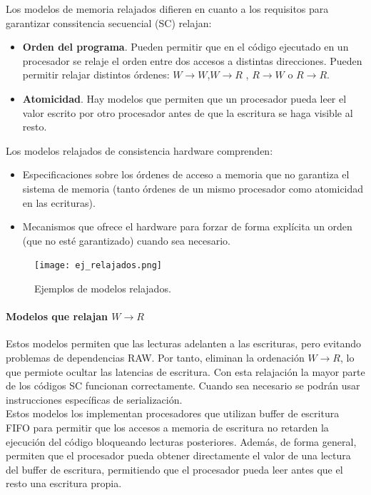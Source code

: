 \documentclass[12pt,spanish]{article}
\begin{document}
Los modelos de memoria relajados difieren en cuanto a los requisitos para garantizar conssitencia secuencial (SC) relajan:
\begin{itemize}
	\item \textbf{Orden del programa}. Pueden permitir que en el código ejecutado en un procesador se relaje el orden entre dos accesos a distintas direcciones. Pueden permitir relajar distintos órdenes: $W \rightarrow W$,$W \rightarrow R$ , $R \rightarrow W$ o $R \rightarrow R$.
	\item \textbf{Atomicidad}. Hay modelos que permiten que un procesador pueda leer el valor escrito por otro procesador antes de que la escritura se haga visible al resto.
\end{itemize}

Los modelos relajados de consistencia hardware comprenden:

\begin{itemize}
	\item Especificaciones sobre los órdenes de acceso a memoria que no garantiza el sistema de memoria (tanto órdenes de un mismo procesador como atomicidad en las ecrituras).
	\item Mecanismos que ofrece el hardware para forzar de forma explícita un orden (que no esté garantizado) cuando sea necesario.
\end{itemize}

\begin{figure}[H]
\centering
\texttt{[image: ej\_relajados.png]}
\caption{Ejemplos de modelos relajados.}
\end{figure}

\paragraph{Modelos que relajan $W \rightarrow R$\\}

Estos modelos permiten que las lecturas adelanten a las escrituras, pero evitando problemas de dependencias RAW. Por tanto, eliminan la ordenación $W \rightarrow R$, lo que permiote ocultar las latencias de escritura. Con esta relajación la mayor parte de los códigos SC funcionan correctamente. Cuando sea necesario se podrán usar instrucciones específicas de serialización.\\

Estos modelos los implementan procesadores que utilizan buffer de escritura FIFO para permitir que los accesos a memoria de escritura no retarden la ejecución del código bloqueando lecturas posteriores. Además, de forma general, permiten que el procesador pueda obtener directamente el valor de una lectura del buffer de escritura, permitiendo que el procesador pueda leer antes que el resto una escritura propia.\\
\end{document}
